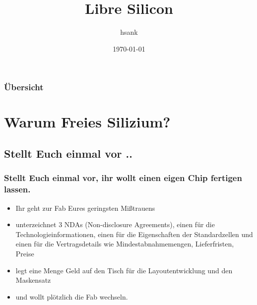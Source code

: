 \documentclass{beamer}
\title[Libre Silicon]{Libre Silicon} %
\author{hsank} %
\institute[Chipforge] %
{
Chipforge\\ %
\medskip
\textit{hsank@nospam.chipforge.org} %
}
\date{\today} %
\begin{document}
\begin{frame}
\titlepage %
\end{frame}

\begin{frame}
\frametitle{Übersicht} %
\tableofcontents %
\end{frame}


\section{Warum Freies Silizium?} %

\subsection{Stellt Euch einmal vor ..} %

\begin{frame}
\frametitle{Stellt Euch einmal vor, ihr wollt einen eigen Chip fertigen lassen.}
\begin{itemize}
\item Ihr geht zur Fab Eures geringsten Mißtrauens
\item unterzeichnet 3 NDAs (Non-disclosure Agreements), einen für die Technologieinformationen, einen für die Eigenschaften der Standardzellen und einen für die Vertragsdetails wie Mindestabnahmemengen, Lieferfristen, Preise
\item legt eine Menge Geld auf den Tisch für die Layoutentwicklung und den Maskensatz
\item und wollt plötzlich die Fab wechseln.
\end{itemize}
\end{frame}
\end{document}
